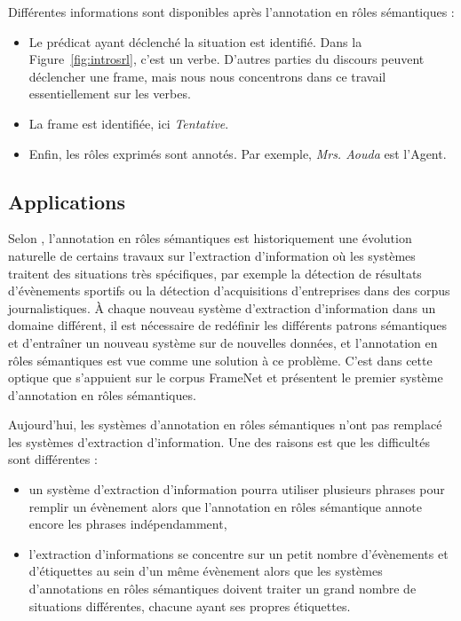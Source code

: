Différentes informations sont disponibles après l'annotation en rôles
sémantiques :

\begin{itemize}
    \item Le prédicat ayant déclenché la situation est identifié. Dans la
        Figure~\ref{fig:introsrl}, c'est un verbe. D'autres parties du discours
        peuvent déclencher une frame, mais nous nous concentrons dans ce
        travail essentiellement sur les verbes.
    \item La frame est identifiée, ici \textit{Tentative}.
    \item Enfin, les rôles exprimés sont annotés. Par exemple, \textit{Mrs.
        Aouda} est l'Agent.
\end{itemize}

\subsection{Applications}

Selon \cite{gildea2002automatic}, l'annotation en rôles sémantiques est
historiquement une évolution naturelle de certains travaux sur l'extraction
d'information où les systèmes traitent des situations très spécifiques, par
exemple la détection de résultats d'évènements sportifs ou la détection
d'acquisitions d'entreprises dans des corpus journalistiques. À chaque nouveau
système d'extraction d'information dans un domaine différent, il est nécessaire
de redéfinir les différents patrons sémantiques et d'entraîner un nouveau
système sur de nouvelles données, et l'annotation en rôles sémantiques est vue
comme une solution à ce problème. C'est dans cette optique que
\citeauthor{gildea2002automatic} s'appuient sur le corpus FrameNet et présentent le
premier système d'annotation en rôles sémantiques.

Aujourd'hui, les systèmes d'annotation en rôles sémantiques n'ont pas remplacé
les systèmes d'extraction d'information. Une des raisons est que les
difficultés sont différentes \citep{boros2014etiquetage} :

\begin{itemize}
    \item un système d'extraction d'information pourra utiliser plusieurs
        phrases pour remplir un évènement alors que l'annotation en rôles
        sémantique annote encore les phrases indépendamment,
    \item l'extraction d'informations se concentre sur un petit nombre
        d'évènements et d'étiquettes au sein d'un même évènement alors que les
        systèmes d'annotations en rôles sémantiques doivent traiter un grand
        nombre de situations différentes, chacune ayant ses propres étiquettes.
\end{itemize}

